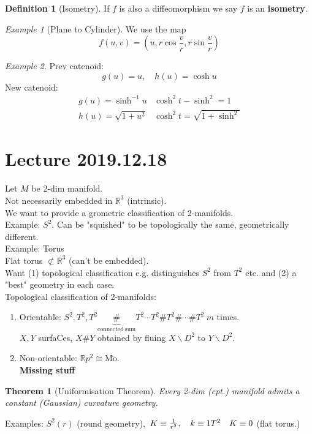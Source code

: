 \documentclass{article}
\let\ddd\cdots
\newcommand{\R}{\mathbb{R}}
\newtheorem{theorem}{Theorem}[section]
\theoremstyle{definition}
\newtheorem{definition}{Definition}[section]
\theoremstyle{remark}
\theoremstyle{example}
\newtheorem*{example}{Example}
\begin{document}
	\begin{definition}[Isometry]
		If $f$ is also a diffeomorphism we say $f$ is an \textbf{isometry}.
	\end{definition}

	\begin{example}[Plane to Cylinder]
		We use the map \[ f(u,v)=\left(u,r\cos\frac{v}{r},r\sin\frac{v}{r}\right) \]
	\end{example}

	\begin{example}
		Prev catenoid: \[g(u)=u,\quad h(u)=\cosh u\]
		New catenoid:
		\[\begin{matrix}
			g(u)=\sinh^{-1}u & \cosh^2t-\sinh^2=1\\
			h(u)=\sqrt{1+u^2} & \cosh^2t=\sqrt{1+\sinh^2}
		\end{matrix}\]
	\end{example}

	\section*{Lecture 2019.12.18}
	Let $M$ be  2-dim manifold.\\
	Not necessarily embedded in $\R^3$ (intrinsic).\\
	We want to provide a grometric classification of 2-manifolds.\\
	Example: $S^2$. Can be "squished" to be topologically the same, geometrically different.\\
	Example: Torus\\
	Flat torus $\not\subset \R^3$ (can't be embedded).\\
	Want (1) topological  classification e.g. distinguishes $S^2$ from $T^2$ etc. and (2) a "best" geometry in each case.\\
	Topological classification of 2-manifolds:
	\begin{enumerate}
		\item Orientable: $S^2, T^2, T^2 \underbrace{\#}_\mathrm{connected\ sum} T^2 \ddd T^2 \# T^2 \# \ddd \# T^2\ m$ times.\\
		$X,Y$ surfaCes, $X \# Y$ obtained by fluing $X \backslash D^2$ to $Y \backslash D^2$.
		\item Non-orientable: $\R p^2 \cong \mathrm{M\ddot{o}}$.\\
		\textbf{Missing stuff}
	\end{enumerate}
	\begin{theorem}[Uniformisation Theorem]
		Every 2-dim (cpt.) manifold admits a constant (Gaussian) curvature geometry.
	\end{theorem}
	Examples: $S^2(r)$ (round geometry),\ $K \equiv \frac1{r^2},\quad k \equiv 1\\
	T^2\quad K \equiv 0$ (flat torus.)
	
\end{document}
